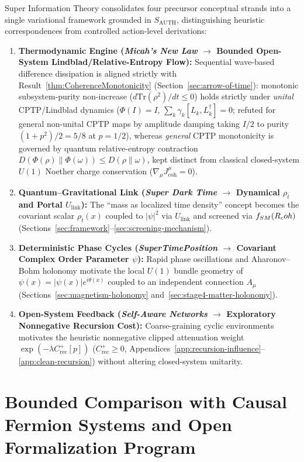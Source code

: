 Super Information Theory consolidates four precursor conceptual strands into a single variational framework grounded in $S_{\mathrm{AUTH}}$, distinguishing heuristic correspondences from controlled action-level derivations:
\begin{enumerate}[leftmargin=2em]
  \item \textbf{Thermodynamic Engine (\emph{Micah's New Law} $\to$ Bounded Open-System Lindblad/Relative-Entropy Flow):} Sequential wave-based difference dissipation is aligned strictly with Result~\ref{thm:CoherenceMonotonicity} (Section~\ref{sec:arrow-of-time}): monotonic subsystem-purity non-increase ($d\mathrm{Tr}(\rho^2)/dt \le 0$) holds strictly under \emph{unital} CPTP/Lindblad dynamics ($\Phi(I) = I$, $\sum_k \gamma_k [L_k, L_k^\dagger] = 0$; refuted for general non-unital CPTP maps by amplitude damping taking $I/2$ to purity $(1+p^2)/2 = 5/8$ at $p = 1/2$), whereas \emph{general} CPTP monotonicity is governed by quantum relative-entropy contraction $D(\Phi(\rho)\|\Phi(\omega)) \le D(\rho\|\omega)$, kept distinct from classical closed-system $U(1)$ Noether charge conservation ($\nabla_\mu J^\mu_{\mathrm{coh}} = 0$).
  \item \textbf{Quantum--Gravitational Link (\emph{Super Dark Time} $\to$ Dynamical $\rho_t$ and Portal $U_{\mathrm{link}}$):} The ``mass as localized time density'' concept becomes the covariant scalar $\rho_t(x)$ coupled to $|\psi|^2$ via $U_{\mathrm{link}}$ and screened via $f_{SM}(R_coh)$ (Sections~\ref{sec:framework}--\ref{sec:screening-mechanism}).
  \item \textbf{Deterministic Phase Cycles (\emph{SuperTimePosition} $\to$ Covariant Complex Order Parameter $\psi$):} Rapid phase oscillations and Aharonov--Bohm holonomy motivate the local $U(1)$ bundle geometry of $\psi(x) = |\psi(x)|e^{i\theta(x)}$ coupled to an independent connection $A_\mu$ (Sections~\ref{sec:magnetism-holonomy} and~\ref{sec:stage4-matter-holonomy}).
  \item \textbf{Open-System Feedback (\emph{Self-Aware Networks} $\to$ Exploratory Nonnegative Recursion Cost):} Coarse-graining cyclic environments motivates the heuristic nonnegative clipped attenuation weight $\exp(-\lambda C_{\mathrm{rec}}^+[p])$ ($C_{\mathrm{rec}}^+ \ge 0$, Appendices~\ref{app:recursion-influence}--\ref{app:clean-recursion}) without altering closed-system unitarity.
\end{enumerate}

\section{Bounded Comparison with Causal Fermion Systems and Open Formalization Program}
\label{app:chronology}

